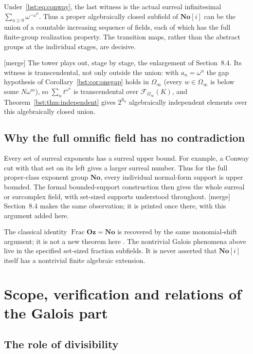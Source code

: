 \documentclass[11pt,letterpaper]{article}
\theoremstyle{definition}
\theoremstyle{remark}
\newcommand{\No}{\mathbf{No}}
\newcommand{\Frac}{\operatorname{Frac}}
\newcommand{\FF}[2]{\mathcal F_{#2}(#1)}
\newcommand{\Oz}{\mathbf{Oz}}
\begin{document}
Under~\eqref{bst:eq:conway}, the last witness is the actual surreal
infinitesimal $\sum_{n\geq0}\omega^{-\omega^n}$. Thus a proper algebraically
closed subfield of $\No[i]$ can be the union of a countable increasing
sequence of fields, each of which has the full finite-group realization
property. The transition maps, rather than the abstract groups at the
individual stages, are decisive.

\textup{[merge]} The tower plays out, stage by stage, the enlargement of
Section~8.4. Its witness is transcendental, not only outside the union:
with $a_n=\omega^n$ the gap hypothesis of Corollary~\ref{bst:cor:onegap}
holds in $\Omega_\infty$ (every $w\in\Omega_\infty$ is below some
$N\omega^m$), so $\sum_nt^{\omega^n}$ is transcendental over
$\FF K{\Omega_\infty}$, and Theorem~\ref{bst:thm:independent} gives
$2^{\aleph_0}$ algebraically independent elements over this algebraically
closed union.

\subsection{Why the full omnific field has no contradiction}

Every set of surreal exponents has a surreal upper bound. For example, a
Conway cut with that set on its left gives a larger surreal number. Thus for
the full proper-class exponent group $\No$, every individual normal-form
support is upper bounded. The formal bounded-support construction then gives
the whole surreal or surcomplex field, with set-sized supports understood
throughout. \textup{[merge]} Section~8.4 makes the same observation; it is
printed once there, with this argument added here.

The classical identity $\Frac\Oz=\No$ is recovered by the same monomial-shift
argument; it is not a new theorem here \cite[Proposition~2.4.5 and its
discussion of Conway's Theorem~32]{LM24}. The nontrivial Galois phenomena
above live in the specified set-sized fraction subfields. It is never
asserted that $\No[i]$ itself has a nontrivial finite algebraic extension.

\section{Scope, verification and relations of the Galois part}\label{bst:gr:sec:scope}

\subsection{The role of divisibility}
\end{document}
